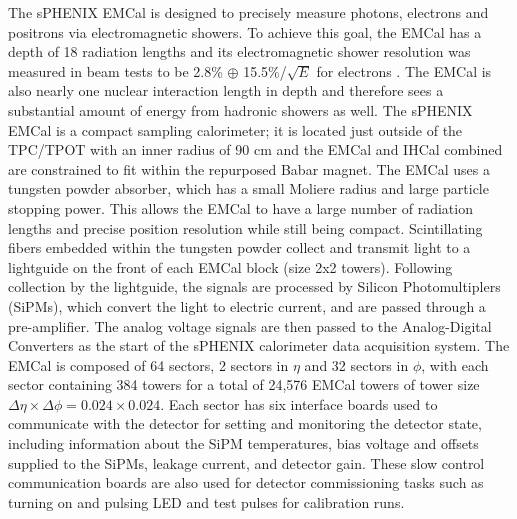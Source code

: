 The sPHENIX EMCal is designed to precisely measure photons, electrons and positrons via electromagnetic showers.
To achieve this goal, the EMCal has a depth of 18 radiation lengths and its electromagnetic shower resolution was measured in beam tests to be 2.8\% $\oplus$ 15.5\%/$\sqrt{E}$ for electrons \cite{emcal_beamtest,emcal_hcal_beamtest}.
The EMCal is also nearly one nuclear interaction length in depth and therefore sees a substantial amount of energy from hadronic showers as well. 
The sPHENIX EMCal is a compact sampling calorimeter; it is located just outside of the TPC/TPOT with an inner radius of 90 cm and the EMCal and IHCal combined are constrained to fit within the repurposed Babar magnet. 
The EMCal uses a tungsten powder absorber, which has a small Moliere radius and large particle stopping power. 
This allows the EMCal to have a large number of radiation lengths and precise position resolution while still being compact. 
Scintillating fibers embedded within the tungsten powder collect and transmit light to a lightguide on the front of each EMCal block (size 2x2 towers). 
Following collection by the lightguide, the signals are processed by Silicon Photomultiplers (SiPMs), which convert the light to electric current, and are passed through a pre-amplifier.
The analog voltage signals are then passed to the Analog-Digital Converters as the start of the sPHENIX calorimeter data acquisition system. 
The EMCal is composed of 64 sectors, 2 sectors in $\eta$ and 32 sectors in $\phi$, with each sector containing 384 towers for a total of 24,576 EMCal towers of tower size $\Delta \eta \times \Delta \phi = 0.024 \times 0.024$.
Each sector has six interface boards used to communicate with the detector for setting and monitoring the detector state, including information about the SiPM temperatures, bias voltage and offsets supplied to the SiPMs, leakage current, and detector gain. 
These slow control communication boards are also used for detector commissioning tasks such as turning on and pulsing LED and test pulses for calibration runs.

